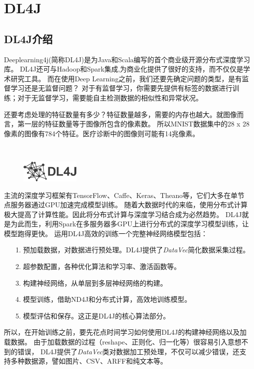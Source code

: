 \chapter{DL4J}
\label{chap:java_dl4j}

\section{DL4J介绍}

Deeplearning4j(简称DL4J)是为Java和Scala编写的首个商业级开源分布式深度学习库。
DL4J还可与Hadoop和Spark集成,为商业化提供了很好的支持，而不仅仅是学术研究工具。
而在使用Deep Learning之前，我们还要先确定问题的类型，是有监督学习还是无监督问题？
对于有监督学习，你需要先提供有标签的数据进行训练；对于无监督学习，需要能自主检测数据的相似性和异常状况。

还要考虑处理的特征数量有多少？特征数量越多，需要的内存也越大。就图像而言，第一层的特征数量等于图像所包含的像素数。
所以MNIST数据集中的28 x 28像素的图像有784个特征。医疗诊断中的图像则可能有14兆像素。

\ \\
\begin{figure}[!htb]
\centerline{\includegraphics{images/dl4j_logo.png}}
\label{fig:part3_dl4j_logo}
\end{figure}

主流的深度学习框架有TensorFlow、Caffe、Keras、Theano等，它们大多在单节点服务器通过GPU加速完成模型训练。
随着大数据时代的来临，使用分布式计算极大提高了计算性能。因此将分布式计算与深度学习结合成为必然趋势。
DL4J就是为此而生，利用Spark在多服务器多GPU上进行分布式的深度学习模型训练，让模型跑得更快。
运用DL4J高效的训练一个完整神经网络模型包括：
\begin{itemize}
\item[1.] 预加载数据，对数据进行预处理。DL4J提供了\emph{DataVec}简化数据采集过程。
\item[2.] 超参数配置，各种优化算法和学习率、激活函数等。
\item[3.] 构建神经网络，从单层到多层神经网络的构建。
\item[4.] 模型训练，借助ND4J和分布式计算，高效地训练模型。
\item[5.] 模型评估和保存。这正是DL4J的核心算法部分。
\end{itemize}

所以，在开始训练之前，要先花点时间学习如何使用DL4J的构建神经网络以及加载数据。
由于加载数据的过程（reshape、正则化、归一化等）很容易引入意想不到的错误，
DL4J提供了\emph{DataVec}类对数据加工预处理，不仅可以减少错误，还支持多种数据源，譬如图片、CSV、ARFF和纯文本等。

